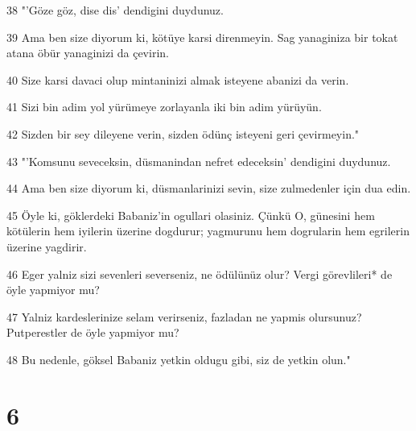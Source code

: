 \par 38 "'Göze göz, dise dis' dendigini duydunuz.
\par 39 Ama ben size diyorum ki, kötüye karsi direnmeyin. Sag yanaginiza bir tokat atana öbür yanaginizi da çevirin.
\par 40 Size karsi davaci olup mintaninizi almak isteyene abanizi da verin.
\par 41 Sizi bin adim yol yürümeye zorlayanla iki bin adim yürüyün.
\par 42 Sizden bir sey dileyene verin, sizden ödünç isteyeni geri çevirmeyin."
\par 43 "'Komsunu seveceksin, düsmanindan nefret edeceksin' dendigini duydunuz.
\par 44 Ama ben size diyorum ki, düsmanlarinizi sevin, size zulmedenler için dua edin.
\par 45 Öyle ki, göklerdeki Babaniz'in ogullari olasiniz. Çünkü O, günesini hem kötülerin hem iyilerin üzerine dogdurur; yagmurunu hem dogrularin hem egrilerin üzerine yagdirir.
\par 46 Eger yalniz sizi sevenleri severseniz, ne ödülünüz olur? Vergi görevlileri* de öyle yapmiyor mu?
\par 47 Yalniz kardeslerinize selam verirseniz, fazladan ne yapmis olursunuz? Putperestler de öyle yapmiyor mu?
\par 48 Bu nedenle, göksel Babaniz yetkin oldugu gibi, siz de yetkin olun."

\chapter{6}

